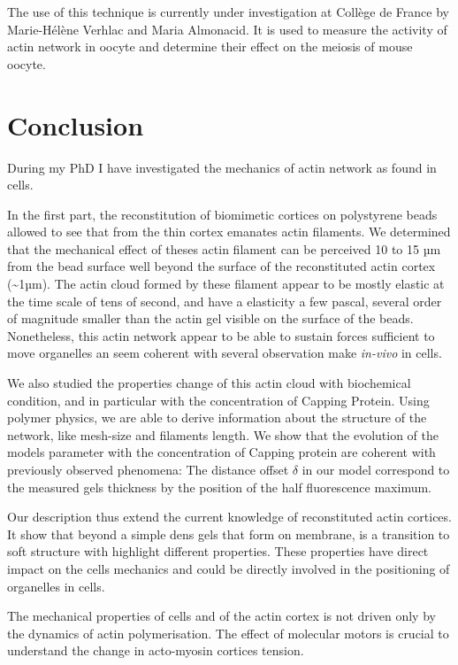 \documentclass[A4paperpaper,11pt,english]{sphinxmanual}
\begin{document}
The use of this technique is currently under investigation at Collège de France
by Marie-Hélène Verhlac and Maria Almonacid. It is used to measure the activity
of actin network in oocyte and determine their effect on the meiosis of mouse
oocyte.


\chapter{Conclusion}
\label{parts/conclusion::doc}\label{parts/conclusion:conclusion}
During my PhD I have investigated the mechanics of actin network as found in
cells.

In the first part, the reconstitution of biomimetic cortices on polystyrene
beads allowed to see that from the thin cortex emanates actin filaments. We
determined that the mechanical effect of theses actin filament can be perceived
10 to 15 µm from the bead surface well beyond the surface of the reconstituted
actin cortex (\textasciitilde{}1µm). The actin cloud formed by these filament appear to be
mostly elastic at the time scale of tens of second, and have a elasticity a few
pascal, several order of magnitude smaller than the actin gel visible on the
surface of the beads. Nonetheless, this actin network appear to be able to
sustain forces sufficient to move organelles an seem coherent with several
observation make \emph{in-vivo} in cells.

We also studied the properties change of this actin cloud with biochemical
condition, and in particular with the concentration of Capping Protein.  Using
polymer physics, we are able to derive information about the structure of the
network, like mesh-size and filaments length. We show that the evolution of the
models parameter with the concentration of Capping protein are coherent with
previously observed phenomena: The distance offset \(\delta\) in our model
correspond to the measured gels thickness by the position of the half
fluorescence maximum.

Our description thus extend the current knowledge of reconstituted actin
cortices. It show that beyond a simple dens gels that form on membrane, is a
transition to soft structure with highlight different properties. These
properties have direct impact on the cells mechanics and could be directly
involved in the positioning of organelles in cells.

The mechanical properties of cells and of the actin cortex is not driven only
by the dynamics of actin polymerisation. The effect of molecular motors is
crucial to understand  the change in acto-myosin cortices tension.
\end{document}
